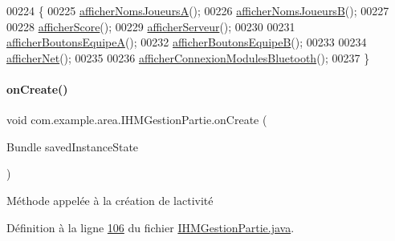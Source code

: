 \begin{DoxyCode}
00224     \{
00225         \hyperlink{classcom_1_1example_1_1area_1_1_i_h_m_gestion_partie_adf3bc699cb45da1f1dea4cb5e16e74f3}{afficherNomsJoueursA}();
00226         \hyperlink{classcom_1_1example_1_1area_1_1_i_h_m_gestion_partie_a55e51d83d01ea0c3c6400f6419edfd06}{afficherNomsJoueursB}();
00227 
00228         \hyperlink{classcom_1_1example_1_1area_1_1_i_h_m_gestion_partie_a42cce9ee62fd37d687d4a194328aac70}{afficherScore}();
00229         \hyperlink{classcom_1_1example_1_1area_1_1_i_h_m_gestion_partie_adf8fc8de224da80f542675cbb4c2e364}{afficherServeur}();
00230 
00231         \hyperlink{classcom_1_1example_1_1area_1_1_i_h_m_gestion_partie_a6c63ebbc9822ef53f43468d100ab5677}{afficherBoutonsEquipeA}();
00232         \hyperlink{classcom_1_1example_1_1area_1_1_i_h_m_gestion_partie_a00c0111f1b2d4d1161515e2c04ca645c}{afficherBoutonsEquipeB}();
00233 
00234         \hyperlink{classcom_1_1example_1_1area_1_1_i_h_m_gestion_partie_a1892c3b33ec5d93514dfa8e30f61204d}{afficherNet}();
00235 
00236         \hyperlink{classcom_1_1example_1_1area_1_1_i_h_m_gestion_partie_ade4de81cd6978057a06e16e2e577180c}{afficherConnexionModulesBluetooth}();
00237     \}
\end{DoxyCode}
\mbox{\label{classcom_1_1example_1_1area_1_1_i_h_m_gestion_partie_a501249e0f0625aa3e0784ce5f2b51cd8}} 
\paragraph{\texorpdfstring{on\+Create()}{onCreate()}}
{\footnotesize\ttfamily void com.\+example.\+area.\+I\+H\+M\+Gestion\+Partie.\+on\+Create (\begin{DoxyParamCaption}\item[{Bundle}]{saved\+Instance\+State }\end{DoxyParamCaption})\hspace{0.3cm}{\ttfamily [protected]}}



Méthode appelée à la création de l\textquotesingle{}activité 



Définition à la ligne \hyperlink{_i_h_m_gestion_partie_8java_source_l00106}{106} du fichier \hyperlink{_i_h_m_gestion_partie_8java_source}{I\+H\+M\+Gestion\+Partie.\+java}.



